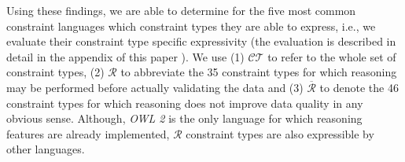 \documentclass{acm_proc_article-sp}
\newcommand{\ms}[1]{%
  \texttt{#1}
}
\newcommand{\tb}[1]{\todo[size=\small, color=green!40]{\textbf{Thomas:} #1}}
\newcommand{\er}[1]{\todo[size=\small, color=red!40]{\textbf{Erman:} #1}}
\newenvironment{evaluation}{
  \begin{tabular}{l|c|c|c|c|c|c}
  \hline
  \textbf{Constraint Class} & \textbf{DSP} & \textbf{OWL2-DL} & \textbf{OWL2-QL} & \textbf{ReSh} & \textbf{ShEx} & \textbf{SPIN} \\
  \hline

}{
  \hline
  \end{tabular}
  \linebreak
}
\begin{document}
Using these findings, we are able to determine for the five most common constraint languages which constraint types they are able to express, i.e., we evaluate their constraint type specific expressivity (the evaluation is described in detail in the appendix of this paper \cite{BoschNolleAcarEckert2015}).
We use 
(1) $\mathcal{CT}$ to refer to the whole set of constraint types,
(2) $\mathcal{R}$ to abbreviate the 35 constraint types for which reasoning may be performed before actually validating the data and
(3) $\overline{\mathcal{R}}$ to denote the 46 constraint types for which reasoning does not improve data quality in any obvious sense.
Although, \emph{OWL 2} is the only language for which reasoning features are already implemented, 
$\mathcal{R}$ constraint types are also expressible by other languages. 
\end{document}
